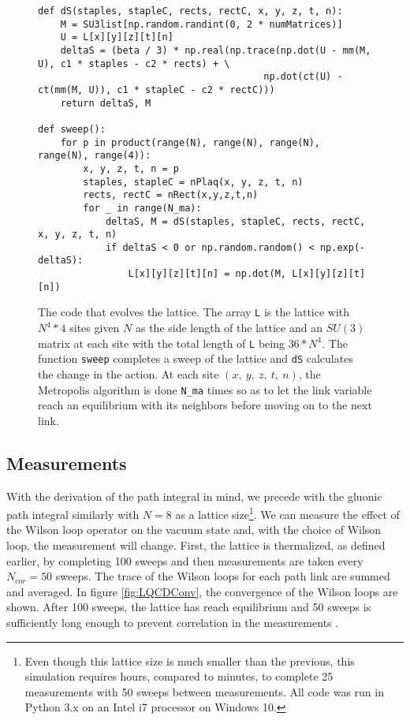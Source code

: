 \documentclass[11pt]{article}
\begin{document}
\begin{figure}[h]
\begin{lstlisting}
def dS(staples, stapleC, rects, rectC, x, y, z, t, n):
    M = SU3list[np.random.randint(0, 2 * numMatrices)]
    U = L[x][y][z][t][n]
    deltaS = (beta / 3) * np.real(np.trace(np.dot(U - mm(M, U), c1 * staples - c2 * rects) + \
                                        np.dot(ct(U) - ct(mm(M, U)), c1 * stapleC - c2 * rectC)))             
    return deltaS, M

def sweep():
    for p in product(range(N), range(N), range(N), range(N), range(4)):
        x, y, z, t, n = p
        staples, stapleC = nPlaq(x, y, z, t, n)
        rects, rectC = nRect(x,y,z,t,n)
        for _ in range(N_ma):
            deltaS, M = dS(staples, stapleC, rects, rectC, x, y, z, t, n)
            if deltaS < 0 or np.random.random() < np.exp(-deltaS):
                L[x][y][z][t][n] = np.dot(M, L[x][y][z][t][n])
\end{lstlisting}
\caption{The code that evolves the lattice. The array \texttt{L} is the lattice with $N^4*4$ sites given $N$ as the side length of the lattice and an $SU(3)$ matrix at each site with the total length of \texttt{L} being $36*N^4$. The function \texttt{sweep} completes a sweep of the lattice and \texttt{dS} calculates the change in the action. At each site $(x,\ y,\ z,\ t,\ n)$, the Metropolis algorithm is done \texttt{N\_ma} times so as to let the link variable reach an equilibrium with its neighbors before moving on to the next link.}
\label{fig:LQCDSweep}
\end{figure}

\subsection{Measurements}
With the derivation of the path integral in mind, we precede with the gluonic path integral similarly with $N=8$ as a lattice size\footnote{Even though this lattice size is much smaller than the previous, this simulation requires hours, compared to minutes, to complete 25 measurements with 50 sweeps between measurements. All code was run in Python 3.x on an Intel i7 processor on Windows 10.}. We can measure the effect of the Wilson loop operator on the vacuum state and, with the choice of Wilson loop, the measurement will change. First, the lattice is thermalized, as defined earlier, by completing 100 sweeps and then measurements are taken every $N_{cor}=50$ sweeps. The trace of the Wilson loops for each path link are summed and averaged. In figure \ref{fig:LQCDConv}, the convergence of the Wilson loops are shown. After 100 sweeps, the lattice has reach equilibrium and 50 sweeps is sufficiently long enough to prevent correlation in the measurements \cite{MainPaper}.
\end{document}
